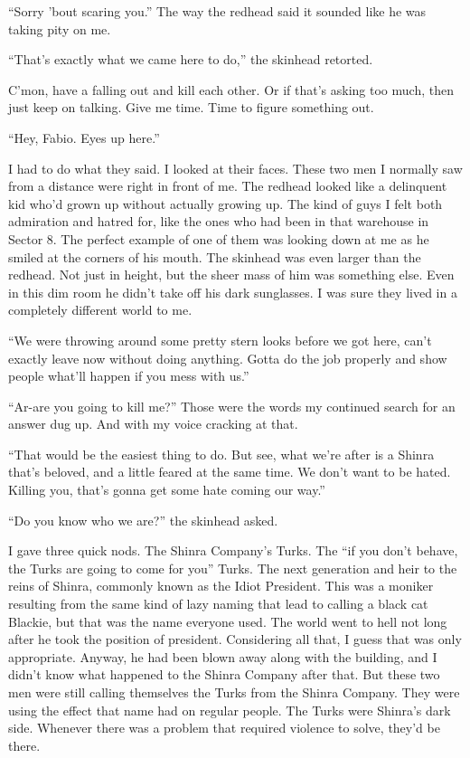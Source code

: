 \documentclass[oneside]{book}
\begin{document}
“Sorry ’bout scaring you.” The way the redhead said it sounded like he was taking pity on me.

“That’s exactly what we came here to do,” the skinhead retorted.

C’mon, have a falling out and kill each other. Or if that’s asking too much, then just keep on talking. Give me time. Time to figure something out.

“Hey, Fabio. Eyes up here.”

I had to do what they said. I looked at their faces. These two men I normally saw from a distance were right in front of me. The redhead looked like a delinquent kid who’d grown up without actually growing up. The kind of guys I felt both admiration and hatred for, like the ones who had been in that warehouse in Sector 8. The perfect example of one of them was looking down at me as he smiled at the corners of his mouth. The skinhead was even larger than the redhead. Not just in height, but the sheer mass of him was something else. Even in this dim room he didn’t take off his dark sunglasses. I was sure they lived in a completely different world to me.

“We were throwing around some pretty stern looks before we got here, can’t exactly leave now without doing anything. Gotta do the job properly and show people what’ll happen if you mess with us.”

“Ar-are you going to kill me?” Those were the words my continued search for an answer dug up. And with my voice cracking at that.

“That would be the easiest thing to do. But see, what we’re after is a Shinra that’s beloved, and a little feared at the same time. We don’t want to be hated. Killing you, that’s gonna get some hate coming our way.”

“Do you know who we are?” the skinhead asked.

I gave three quick nods. The Shinra Company’s Turks. The “if you don’t behave, the Turks are going to come for you” Turks. The next generation and heir to the reins of Shinra, commonly known as the Idiot President. This was a moniker resulting from the same kind of lazy naming that lead to calling a black cat Blackie, but that was the name everyone used. The world went to hell not long after he took the position of president. Considering all that, I guess that was only appropriate. Anyway, he had been blown away along with the building, and I didn’t know what happened to the Shinra Company after that. But these two men were still calling themselves the Turks from the Shinra Company. They were using the effect that name had on regular people. The Turks were Shinra’s dark side. Whenever there was a problem that required violence to solve, they’d be there.
\end{document}
